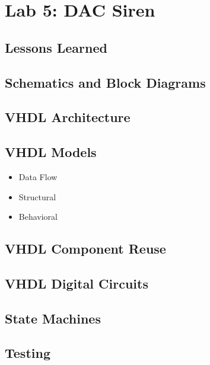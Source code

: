 \chapter{Lab 5: DAC Siren \\
\label{Introduction}}


\section{Lessons Learned
\label{Section::Lessons Learned}}
 \section{Schematics and Block Diagrams}
 \section{VHDL Architecture}
 \section{VHDL Models}
 \begin{itemize}
     \item Data Flow
     \item Structural
     \item Behavioral
\end{itemize}
 \section{VHDL Component Reuse}
 \section{VHDL Digital Circuits}
 \section{State Machines}
 \section{Testing}
